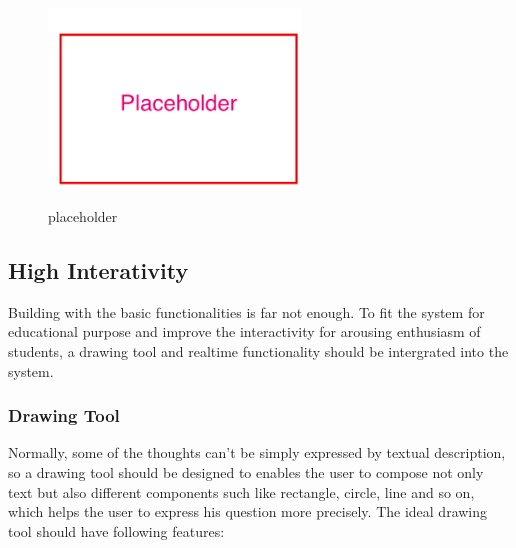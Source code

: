 \begin{enumerate}
\begin{figure}[!htbp]
  \caption{placeholder}
  \centering
    \includegraphics[width=0.6\textwidth]{Figures/placeholder.png}
  \label{fig:placeholder}
\end{figure}

\end{enumerate}


\subsection{High Interativity}
Building with the basic functionalities is far not enough. To fit the system for educational purpose and improve the interactivity for arousing enthusiasm of students, a drawing tool and realtime functionality should be intergrated into the system.

\subsubsection{Drawing Tool}
Normally, some of the thoughts can't be simply expressed by textual description, so a drawing tool should be designed to enables the user to compose not only text but also different components such like rectangle, circle, line and so on, which helps the user to express his question more precisely.
The ideal drawing tool should have following features:

